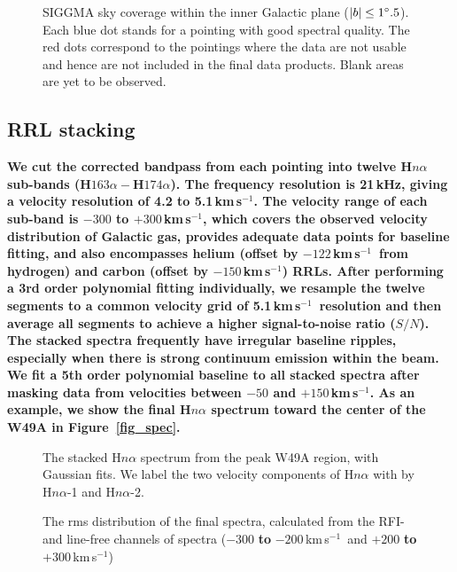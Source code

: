 \documentclass[manuscript]{aastex61}
\newcommand{\kms}{\,km\,s$^{-1}$}
\begin{document}
\begin{figure}[hbtp]
\caption{SIGGMA sky coverage within the inner Galactic plane ($|b| \leq 1\mbox{$^\circ$}.5$).
Each blue dot stands for a pointing with good spectral quality.
The red dots correspond to the pointings where the data are not usable and hence are not included in the final data products.
Blank areas are yet to be observed.
}\label{fig_skycover}
\end{figure}

\subsection{RRL stacking} \label{sec_stack}

\textbf{We cut the corrected bandpass from each pointing into twelve H$n\alpha$ sub-bands (H$163\alpha - $H$174\alpha$).
The frequency resolution is 21\,kHz, giving a velocity resolution of 4.2 \textbf{to} 5.1\kms.  
The velocity range of each sub-band is $-300$ to $+300$\kms, which covers the observed velocity distribution of Galactic gas, provides adequate data points for baseline fitting, and also encompasses helium (offset by $-122$\kms\ from hydrogen) and carbon (offset by $-150$\kms) RRLs.
After performing a 3rd order polynomial fitting individually, we resample the twelve segments to a common velocity grid of 5.1\kms\ resolution and then average all segments to achieve a higher signal-to-noise ratio ($S/N$).
The stacked spectra frequently have irregular baseline ripples, especially when there is strong continuum emission within the beam.
We fit a 5th order polynomial baseline to all stacked spectra after masking data from velocities between $-50$ and $+150$\kms.
As an example, we show the final H$n\alpha$ spectrum toward the center of the W49A in Figure~\ref{fig_spec}.}


\begin{figure}%
\begin{minipage}{.48\textwidth}
\centering
{}
\caption{The stacked H$n\alpha$ spectrum from the peak W49A region, with Gaussian fits.
We label the two velocity components of H$n\alpha$ with by H$n\alpha$-1 and H$n\alpha$-2.
}\label{fig_spec}
\end{minipage}
\hfill
\begin{minipage}{.48\textwidth}
\centering
{}
\caption{The rms distribution of the final spectra, calculated from the RFI- and line-free channels of spectra ($-300$ \textbf{to} $-200$\kms\ and $+200$ \textbf{to} $+300$\kms)
}\label{fig_rms}
\end{minipage}
\end{figure}
\end{document}
